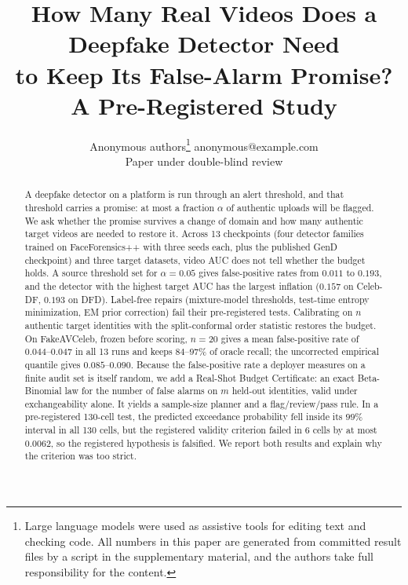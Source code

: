 \documentclass[10pt]{article} %
\title{How Many Real Videos Does a Deepfake Detector Need\\to Keep Its False-Alarm Promise? A Pre-Registered Study}
\author{\name Anonymous authors\thanks{Large language models were used as assistive tools for editing text and checking code. All numbers in this paper are generated from committed result files by a script in the supplementary material, and the authors take full responsibility for the content.} \email anonymous@example.com \\
      \addr Paper under double-blind review}
\begin{document}
\maketitle

\begin{abstract}
A deepfake detector on a platform is run through an alert threshold, and that threshold carries a promise: at most a fraction $\alpha$ of authentic uploads will be flagged. We ask whether the promise survives a change of domain and how many authentic target videos are needed to restore it. Across 13 checkpoints (four detector families trained on FaceForensics++ with three seeds each, plus the published GenD checkpoint) and three target datasets, video AUC does not tell whether the budget holds. A source threshold set for $\alpha=0.05$ gives false-positive rates from $0.011$ to $0.193$, and the detector with the highest target AUC has the largest inflation ($0.157$ on Celeb-DF, $0.193$ on DFD). Label-free repairs (mixture-model thresholds, test-time entropy minimization, EM prior correction) fail their pre-registered tests. Calibrating on $n$ authentic target identities with the split-conformal order statistic restores the budget. On FakeAVCeleb, frozen before scoring, $n=20$ gives a mean false-positive rate of $0.044$--$0.047$ in all 13 runs and keeps $84$--$97\%$ of oracle recall; the uncorrected empirical quantile gives $0.085$--$0.090$. Because the false-positive rate a deployer measures on a finite audit set is itself random, we add a Real-Shot Budget Certificate: an exact Beta-Binomial law for the number of false alarms on $m$ held-out identities, valid under exchangeability alone. It yields a sample-size planner and a flag/review/pass rule. In a pre-registered 130-cell test, the predicted exceedance probability fell inside its $99\%$ interval in all 130 cells, but the registered validity criterion failed in 6 cells by at most $0.0062$, so the registered hypothesis is falsified. We report both results and explain why the criterion was too strict.
\end{abstract}











\appendix

\end{document}
